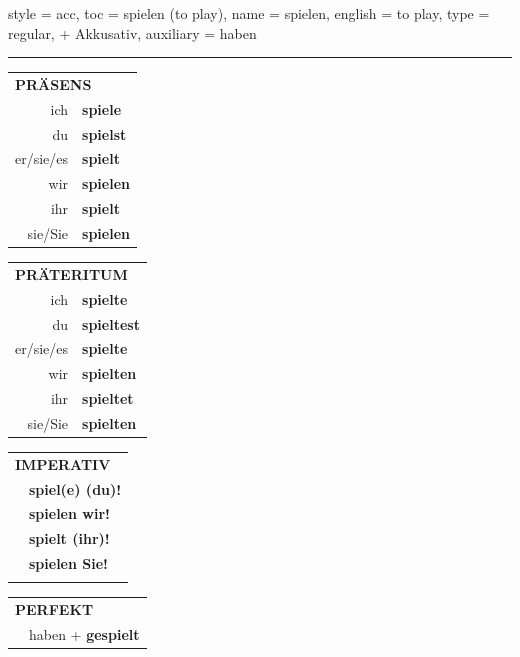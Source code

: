 \begin{verbentry}{
  style = {acc},
  toc = {spielen (to play)},
  name = {spielen},
  english = {to play},
  type = {regular, + Akkusativ},
  auxiliary = {haben}
}
 
    
     \vspace{5pt}

    \hrule
    
    \vspace{5pt}

  \begin{tabular}{rl}
     \multicolumn{2}{l}{\textbf{PRÄSENS} }\\
    ich & \textbf{spiele}\\
    du & \textbf{spielst}\\
    er/sie/es & \textbf{spielt}\\
    wir & \textbf{spielen}\\
    ihr & \textbf{spielt}\\
    sie/Sie & \textbf{spielen}\\
  \end{tabular}
  \hfill
     \begin{tabular}{rl}
    \multicolumn{2}{l}{\textbf{PRÄTERITUM} }\\
    ich & \textbf{spielte}\\
    du & \textbf{spieltest}\\
    er/sie/es & \textbf{spielte}\\
    wir & \textbf{spielten}\\
    ihr & \textbf{spieltet}\\
    sie/Sie & \textbf{spielten}\\
  \end{tabular}
  \hfill
  \begin{tabular}{rl}
     \multicolumn{2}{l}{\textbf{IMPERATIV} }\\
   & \textbf{spiel(e) (du)!}\\
   & \textbf{spielen wir!}\\
   & \textbf{spielt (ihr)!}\\
   & \textbf{spielen Sie!}\\
   & \vspace{10pt}
  \end{tabular}

    \vspace{10pt}

 \begin{tabular}{rl}
     \multicolumn{2}{l}{\textbf{PERFEKT}}\\
   & haben + \textbf{gespielt}\\
  \end{tabular}
\hfill
   \begin{tabular}{rl}
   

\end{tabular}
\end{verbentry}
